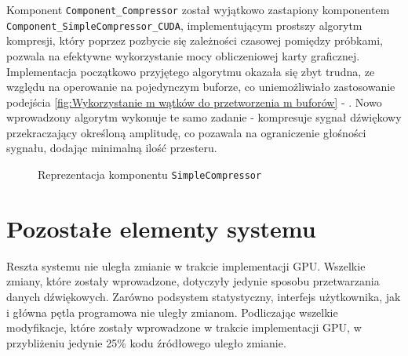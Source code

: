 \vspace{10pt}Komponent \texttt{Component\_Compressor} został wyjątkowo zastapiony komponentem \texttt{Component\_SimpleCompressor\_CUDA}, implementującym prostszy algorytm kompresji, który poprzez pozbycie się zależności czasowej pomiędzy próbkami, pozwala na efektywne wykorzystanie mocy obliczeniowej karty graficznej. Implementacja początkowo przyjętego algorytmu okazała się zbyt trudna, ze względu na operowanie na pojedynczym buforze, co uniemożliwiało zastosowanie podejścia
\ref{fig:Wykorzystanie m wątków do przetworzenia m buforów} - . 
Nowo wprowadzony algorytm wykonuje te samo zadanie - kompresuje sygnał dźwiękowy przekraczający określoną amplitudę, co pozawala na ograniczenie głośności sygnału, dodając minimalną ilość przesteru. 

\begin{figure}[H]
    \centering
    
    \caption{Reprezentacja komponentu \texttt{SimpleCompressor}}
    \label{fig:Reprezentacja komponentu SimpleCompressor}
\end{figure}


\section{Pozostałe elementy systemu}
Reszta systemu nie uległa zmianie w trakcie implementacji GPU. Wszelkie zmiany, które zostały wprowadzone, dotyczyły jedynie sposobu przetwarzania danych dźwiękowych. Zarówno podsystem statystyczny, interfejs użytkownika, jak i główna pętla programowa nie uległy zmianom. Podliczając wszelkie modyfikacje, które zostały wprowadzone w trakcie implementacji GPU, w przybliżeniu jedynie 25\% kodu źródłowego uległo zmianie. 